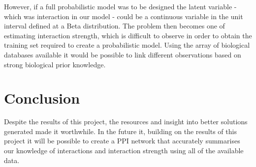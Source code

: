However, if a full probabilistic model was to be designed the latent variable - which was interaction in our model - could be a continuous variable in the unit interval defined at a Beta distribution.
The problem then becomes one of estimating interaction strength, which is difficult to observe in order to obtain the training set required to create a probabilistic model.
Using the array of biological databases available it would be possible to link different observations based on strong biological prior knowledge.






\section*{Conclusion}

Despite the results of this project, the resources and insight into better solutions generated made it worthwhile.
In the future it, building on the results of this project it will be possible to create a \ac{PPI} network that accurately summarises our knowledge of interactions and interaction strength using all of the available data.
